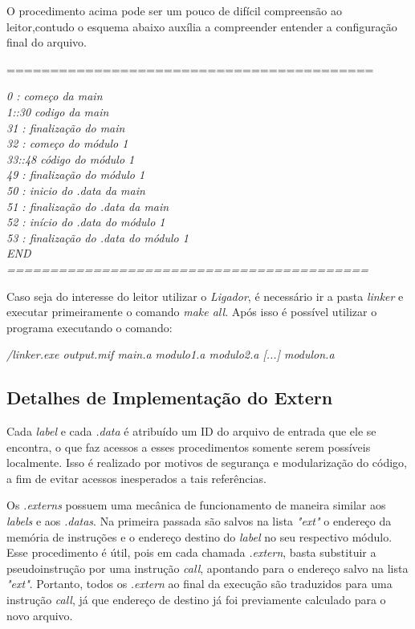 \documentclass{article}
\begin{document}
O procedimento acima pode ser um pouco de difícil compreensão ao leitor,contudo o esquema abaixo auxília a compreender entender a configuração final do arquivo.

\noindent==========================================

\noindent\textit{0 : começo da main\\
1::30 codigo da main\\
31 : finalização do main\\
32 : começo do módulo 1\\
33::48 código do módulo 1\\
49 : finalização do módulo 1\\
50 : inicio do .data da main\\
51 : finalização do .data da main\\
52 : início do .data do módulo 1\\
53 : finalização do .data do módulo 1\\
END\\
==========================================}

Caso seja do interesse do leitor utilizar o \textit{Ligador}, é necessário ir a pasta \textit{linker} e executar primeiramente o comando \textit{make all}. Após isso é possível utilizar o programa executando o comando:

\begin{center} \textit{/linker.exe output.mif main.a modulo1.a modulo2.a [...] modulon.a} \end{center}

\subsection{Detalhes de Implementação do Extern}

Cada \textit{label} e cada \textit{.data} é atribuído um ID do arquivo de entrada que ele se encontra, o que faz acessos a esses procedimentos somente serem possíveis localmente. Isso é realizado por motivos de segurança e modularização do código, a fim de evitar acessos inesperados a tais referências.

Os \textit{.externs} possuem uma mecânica de funcionamento de maneira similar aos \textit{labels} e aos \textit{.datas}. Na primeira passada são salvos na lista \textit{"ext"} o endereço da memória de instruções e o endereço destino do \textit{label} no seu respectivo módulo. Esse procedimento é útil, pois em cada chamada \textit{.extern}, basta substituir a pseudoinstrução por uma instrução \textit{call}, apontando para o endereço salvo na lista \textit{"ext"}. Portanto, todos os \textit{.extern} ao final da execução são traduzidos para uma instrução \textit{call}, já que endereço de destino já foi previamente calculado para o novo arquivo.
\end{document}
